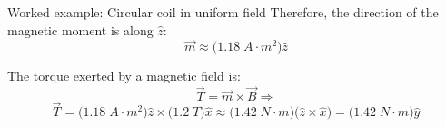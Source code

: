 {\begin{frame}{Worked example: Circular coil in uniform field}
\vspace{0.1cm}
Therefore, the direction of the magnetic moment is along $\hat{z}$:
\begin{equation*}
   \vec{m} \approx \Big( 1.18 \; A \cdot m^2 \Big) \hat{z}
\end{equation*}

The torque exerted by a magnetic field is:
\begin{equation*}
     \vec{T} = \vec{m} \times \vec{B} \Rightarrow
\end{equation*}
\begin{equation*}
     \vec{T}
     = \Big( 1.18 \; A \cdot m^2 \Big) \hat{z} \times \Big( 1.2 \; T \Big) \hat{x}
     \approx \Big( 1.42 \; N \cdot m \Big) \Big( \hat{z} \times \hat{x} \Big)
     = \Big( 1.42 \; N \cdot m \Big) \hat{y}
\end{equation*}

\end{frame}

} %


%
%

